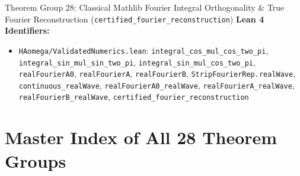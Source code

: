 \documentclass[11pt,a4paper]{article}
\newcommand{\lean}[1]{\texttt{\nolinkurl{#1}}}
\begin{document}
\begin{thmcard}{Theorem Group 28: Classical Mathlib Fourier Integral Orthogonality \& True Fourier Reconstruction (\texorpdfstring{\lean{certified_fourier_reconstruction}}{certified\_fourier\_reconstruction})}
\textbf{Lean 4 Identifiers:}
\begin{itemize}
  \item \lean{HAomega/ValidatedNumerics.lean}: \lean{integral_cos_mul_cos_two_pi}, \lean{integral_sin_mul_sin_two_pi}, \lean{integral_sin_mul_cos_two_pi}, \lean{realFourierA0}, \lean{realFourierA}, \lean{realFourierB}, \lean{StripFourierRep.realWave}, \lean{continuous_realWave}, \lean{realFourierA0_realWave}, \lean{realFourierA_realWave}, \lean{realFourierB_realWave}, \lean{certified_fourier_reconstruction}
\end{itemize}
\end{thmcard}

\newpage
\section{Master Index of All 28 Theorem Groups}
\end{document}
